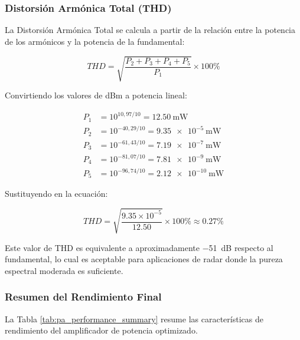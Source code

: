 \subsubsection{Distorsión Armónica Total (THD)}

La Distorsión Armónica Total se calcula a partir de la relación entre la potencia de los armónicos y la potencia de la fundamental:

\begin{equation}
THD = \sqrt{\frac{P_2 + P_3 + P_4 + P_5}{P_1}} \times 100\%
\end{equation}

Convirtiendo los valores de dBm a potencia lineal:

\begin{align}
P_1 &= 10^{10{,}97/10} = \qty{12,50}{\mW} \nonumber \\
P_2 &= 10^{-40{,}29/10} = \qty{9,35e-5}{\mW} \nonumber \\
P_3 &= 10^{-61{,}43/10} = \qty{7,19e-7}{\mW} \nonumber \\
P_4 &= 10^{-81{,}07/10} = \qty{7,81e-9}{\mW} \nonumber \\
P_5 &= 10^{-96{,}74/10} = \qty{2,12e-10}{\mW}
\end{align}

Sustituyendo en la ecuación:

\begin{equation}
THD = \sqrt{\frac{9.35 \times 10^{-5}}{12.50}} \times 100\% \approx \mathbf{0.27\%}
\end{equation}

Este valor de THD es equivalente a aproximadamente \qty{-51}{\dB} respecto al fundamental, lo cual es aceptable para aplicaciones de radar donde la pureza espectral moderada es suficiente.

\subsubsection{Resumen del Rendimiento Final}

La Tabla \ref{tab:pa_performance_summary} resume las características de rendimiento del amplificador de potencia optimizado.

